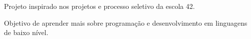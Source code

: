 \documentclass[]{deedy-resume-openfont}
\begin{document}
\begin{minipage}[t]{0.63\textwidth}
\begin{tightemize}
    \item Projeto inspirado nos projetos e processo seletivo da escola 42.
    \item Objetivo de aprender mais sobre programação e desenvolvimento em linguagens de baixo nível.
\end{tightemize}\sectionsep

\end{minipage} 
\end{document}
